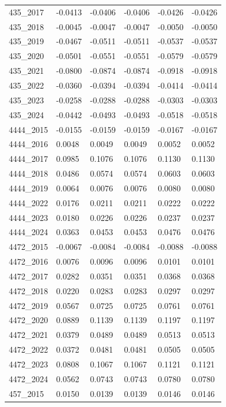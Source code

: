 \begin{table}[htbp]
\begin{tabular}{llllll}
435_2017 & -0.0413 & -0.0406 & -0.0406 & -0.0426 & -0.0426 \\
435_2018 & -0.0045 & -0.0047 & -0.0047 & -0.0050 & -0.0050 \\
435_2019 & -0.0467 & -0.0511 & -0.0511 & -0.0537 & -0.0537 \\
435_2020 & -0.0501 & -0.0551 & -0.0551 & -0.0579 & -0.0579 \\
435_2021 & -0.0800 & -0.0874 & -0.0874 & -0.0918 & -0.0918 \\
435_2022 & -0.0360 & -0.0394 & -0.0394 & -0.0414 & -0.0414 \\
435_2023 & -0.0258 & -0.0288 & -0.0288 & -0.0303 & -0.0303 \\
435_2024 & -0.0442 & -0.0493 & -0.0493 & -0.0518 & -0.0518 \\
4444_2015 & -0.0155 & -0.0159 & -0.0159 & -0.0167 & -0.0167 \\
4444_2016 & 0.0048 & 0.0049 & 0.0049 & 0.0052 & 0.0052 \\
4444_2017 & 0.0985 & 0.1076 & 0.1076 & 0.1130 & 0.1130 \\
4444_2018 & 0.0486 & 0.0574 & 0.0574 & 0.0603 & 0.0603 \\
4444_2019 & 0.0064 & 0.0076 & 0.0076 & 0.0080 & 0.0080 \\
4444_2022 & 0.0176 & 0.0211 & 0.0211 & 0.0222 & 0.0222 \\
4444_2023 & 0.0180 & 0.0226 & 0.0226 & 0.0237 & 0.0237 \\
4444_2024 & 0.0363 & 0.0453 & 0.0453 & 0.0476 & 0.0476 \\
4472_2015 & -0.0067 & -0.0084 & -0.0084 & -0.0088 & -0.0088 \\
4472_2016 & 0.0076 & 0.0096 & 0.0096 & 0.0101 & 0.0101 \\
4472_2017 & 0.0282 & 0.0351 & 0.0351 & 0.0368 & 0.0368 \\
4472_2018 & 0.0220 & 0.0283 & 0.0283 & 0.0297 & 0.0297 \\
4472_2019 & 0.0567 & 0.0725 & 0.0725 & 0.0761 & 0.0761 \\
4472_2020 & 0.0889 & 0.1139 & 0.1139 & 0.1197 & 0.1197 \\
4472_2021 & 0.0379 & 0.0489 & 0.0489 & 0.0513 & 0.0513 \\
4472_2022 & 0.0372 & 0.0481 & 0.0481 & 0.0505 & 0.0505 \\
4472_2023 & 0.0808 & 0.1067 & 0.1067 & 0.1121 & 0.1121 \\
4472_2024 & 0.0562 & 0.0743 & 0.0743 & 0.0780 & 0.0780 \\
457_2015 & 0.0150 & 0.0139 & 0.0139 & 0.0146 & 0.0146 \\

\end{tabular}
\end{table}
